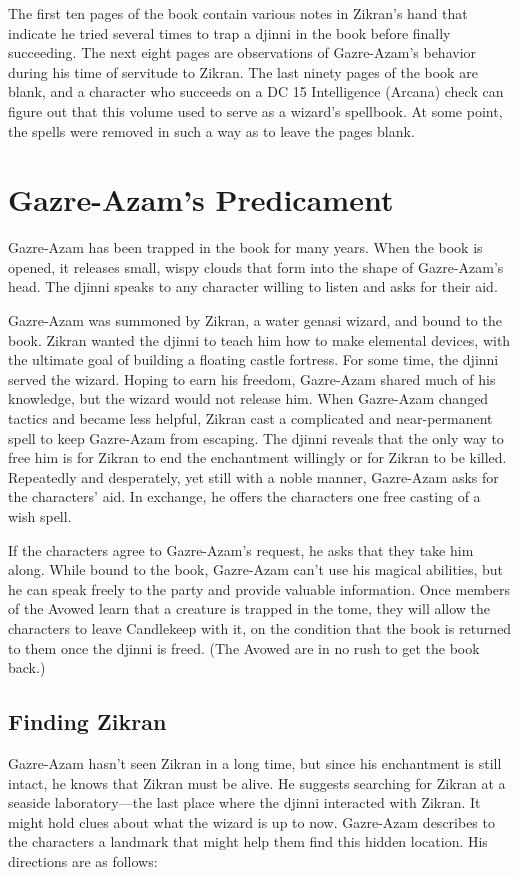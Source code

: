 \documentclass[10pt,a4paper,twoside,bg=print,twocolumn,openany,nodeprecatedcode]{dndbook}
\begin{document}
The first ten pages of the book contain various notes in Zikran's hand that indicate he tried several times to trap a djinni in the book before finally succeeding. The next eight pages are observations of Gazre-Azam's behavior during his time of servitude to Zikran. The last ninety pages of the book are blank, and a character who succeeds on a DC 15 Intelligence (Arcana) check can figure out that this volume used to serve as a wizard's spellbook. At some point, the spells were removed in such a way as to leave the pages blank.

\section{Gazre-Azam's Predicament}
Gazre-Azam has been trapped in the book for many years. When the book is opened, it releases small, wispy clouds that form into the shape of Gazre-Azam's head. The djinni speaks to any character willing to listen and asks for their aid.

Gazre-Azam was summoned by Zikran, a water genasi wizard, and bound to the book. Zikran wanted the djinni to teach him how to make elemental devices, with the ultimate goal of building a floating castle fortress. For some time, the djinni served the wizard. Hoping to earn his freedom, Gazre-Azam shared much of his knowledge, but the wizard would not release him. When Gazre-Azam changed tactics and became less helpful, Zikran cast a complicated and near-permanent spell to keep Gazre-Azam from escaping. The djinni reveals that the only way to free him is for Zikran to end the enchantment willingly or for Zikran to be killed. Repeatedly and desperately, yet still with a noble manner, Gazre-Azam asks for the characters' aid. In exchange, he offers the characters one free casting of a wish spell.

If the characters agree to Gazre-Azam's request, he asks that they take him along. While bound to the book, Gazre-Azam can't use his magical abilities, but he can speak freely to the party and provide valuable information. Once members of the Avowed learn that a creature is trapped in the tome, they will allow the characters to leave Candlekeep with it, on the condition that the book is returned to them once the djinni is freed. (The Avowed are in no rush to get the book back.)

\subsection{Finding Zikran}
Gazre-Azam hasn't seen Zikran in a long time, but since his enchantment is still intact, he knows that Zikran must be alive. He suggests searching for Zikran at a seaside laboratory—the last place where the djinni interacted with Zikran. It might hold clues about what the wizard is up to now. Gazre-Azam describes to the characters a landmark that might help them find this hidden location. His directions are as follows:
\end{document}
